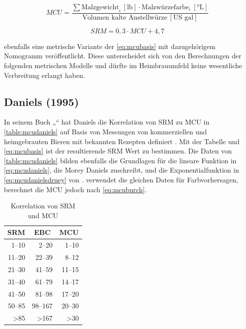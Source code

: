\documentclass[a4paper,parskip=half]{scrartcl}
\newcommand{\MCUL}{\mathit{MCU}}
\newcommand{\SRM}{\mathit{SRM}}
\newcommand{\ulovi}{\:[\textrm{°L}]}
\newcommand{\ugal}{\:[\textrm{US gal}]}
\newcommand{\ulb}{\:[\textrm{lb}]}
\begin{document}
\begin{equation}
\MCUL = \frac{\sum \text{Malzgewicht}_i \ulb \cdot \text{Malzwürzefarbe}_i \ulovi}{\text{Volumen kalte Anstellwürze} \ugal} 
\label{eq:mcubasis}
\end{equation}

\begin{equation}
\SRM = 0,3 \cdot \MCUL + 4,7
\label{eq:mcumosher}
\end{equation}

\textcite[258]{Mosher2015} ebenfalls eine metrische Variante der \autoref{eq:mcubasis} mit dazugehörigem Nomogramm veröffentlicht. Diese unterscheidet sich von den Berechnungen der folgenden metrischen Modelle und dürfte im Heimbrauumfeld keine wesentliche Verbreitung erlangt haben.

\subsection*{Daniels (1995)}

In seinem Buch „“ hat Daniels die Korrelation von SRM zu MCU in \autoref{table:mcudaniels} auf Basis von Messungen von kommerziellen und heimgebrauten Bieren mit bekannten Rezepten definiert \parencite[59]{Daniels1996}. Mit der Tabelle und \autoref{eq:mcubasis} ist der resultierende SRM Wert zu bestimmen. Die Daten von \autoref{table:mcudaniels} bilden ebenfalls die Grundlagen für die lineare Funktion in \autoref{eq:mcudaniels}, die Morey Daniels zuschreibt, und die Exponentialfunktion in \autoref{eq:mcudanielsdruey} von \textcite{Druey1998}. \textcite[10]{Holle2010} verwendet die gleichen Daten für Farbvorhersagen, berechnet die MCU jedoch nach \autoref{eq:mcuburch}.

\begin{table}[H]
\centering
\begin{tabular}{rrr}
\toprule
\multicolumn{1}{c}{\textbf{SRM}} & \multicolumn{1}{c}{\textbf{EBC}} & \multicolumn{1}{c}{\textbf{MCU}} \\
\midrule
1–10 & 2–20 & 1–10 \\
11–20 & 22–39 & 8–12 \\
21–30 & 41–59 & 11–15 \\
31–40 & 61–79 & 14–17 \\
41–50 & 81–98 & 17–20 \\
50–85 & 98–167 & 20–30 \\
>85 & >167 & >30 \\
\bottomrule
\end{tabular}
\caption{Korrelation von SRM und MCU \parencite[61]{Daniels1996}}
\label{table:mcudaniels}
\end{table}
\end{document}
